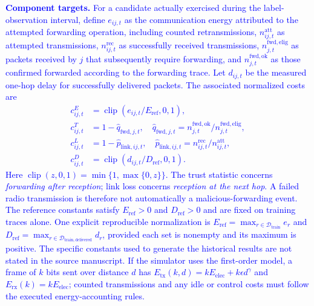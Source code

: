 \documentclass[pdflatex,sn-mathphys-num]{sn-jnl}
\newcommand{\Revised}[1]{\textcolor{blue}{#1}}
\begin{document}
\Revised{\textbf{Component targets.} For a candidate actually exercised during the label-observation interval, define $e_{ij,t}$ as the communication energy attributed to the attempted forwarding operation, including counted retransmissions, $n^{\mathrm{att}}_{ij,t}$ as attempted transmissions, $n^{\mathrm{rec}}_{ij,t}$ as successfully received transmissions, $n^{\mathrm{fwd,elig}}_{j,t}$ as packets received by $j$ that subsequently require forwarding, and $n^{\mathrm{fwd,ok}}_{j,t}$ as those confirmed forwarded according to the forwarding trace. Let $d_{ij,t}$ be the measured one-hop delay for successfully delivered packets. The associated normalized costs are
\begin{align}
 c^E_{ij,t}&=\operatorname{clip}\left(e_{ij,t}/E_{\mathrm{ref}},0,1\right),\label{eq:cost_energy_final}\\
 c^T_{ij,t}&=1-\widehat q_{\mathrm{fwd},j,t},\quad
 \widehat q_{\mathrm{fwd},j,t}=n^{\mathrm{fwd,ok}}_{j,t}/n^{\mathrm{fwd,elig}}_{j,t},\label{eq:cost_trust_final}\\
 c^L_{ij,t}&=1-\widehat p_{\mathrm{link},ij,t},\quad
 \widehat p_{\mathrm{link},ij,t}=n^{\mathrm{rec}}_{ij,t}/n^{\mathrm{att}}_{ij,t},\label{eq:cost_link_final}\\
 c^D_{ij,t}&=\operatorname{clip}\left(d_{ij,t}/D_{\mathrm{ref}},0,1\right).\label{eq:cost_delay_final}
\end{align}
Here $\operatorname{clip}(z,0,1)=\min\{1,\max\{0,z\}\}$. The trust statistic concerns \emph{forwarding after reception}; link loss concerns \emph{reception at the next hop}. A failed radio transmission is therefore not automatically a malicious-forwarding event. The reference constants satisfy $E_{\mathrm{ref}}>0$ and $D_{\mathrm{ref}}>0$ and are fixed on training traces alone. One explicit reproducible normalization is $E_{\mathrm{ref}}=\max_{r\in\mathcal D_{\mathrm{train}}}e_r$ and $D_{\mathrm{ref}}=\max_{r\in\mathcal D_{\mathrm{train,delivered}}}d_r$, provided each set is nonempty and its maximum is positive. The specific constants used to generate the historical results are not stated in the source manuscript. If the simulator uses the first-order model, a frame of $k$ bits sent over distance $d$ has $E_{\mathrm{tx}}(k,d)=k E_{\mathrm{elec}}+k\epsilon d^\gamma$ and $E_{\mathrm{rx}}(k)=kE_{\mathrm{elec}}$; counted transmissions and any idle or control costs must follow the executed energy-accounting rules.}
\end{document}
